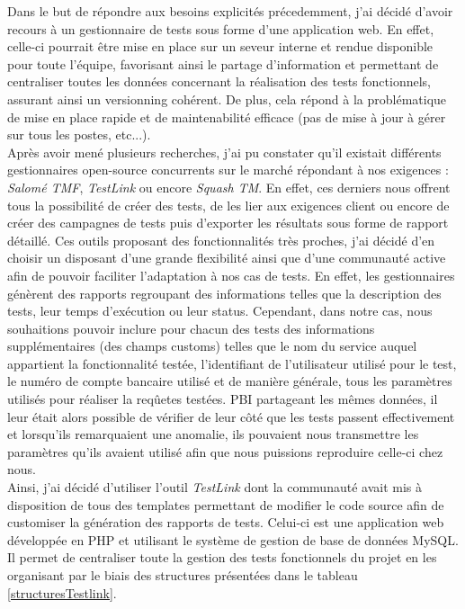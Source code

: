 	Dans le but de répondre aux besoins explicités précedemment, j'ai décidé d'avoir recours à un gestionnaire de tests sous forme d'une application web. En effet, celle-ci pourrait être mise en place sur un seveur interne et rendue disponible pour toute l'équipe, favorisant ainsi le partage d'information et permettant de centraliser toutes les données concernant la réalisation des tests fonctionnels, assurant ainsi un versionning cohérent. De plus, cela répond à la problématique de mise en place rapide et de maintenabilité efficace (pas de mise à jour à gérer sur tous les postes, etc...). \\
	
	Après avoir mené plusieurs recherches, j'ai pu constater qu'il existait différents gestionnaires open-source concurrents sur le marché répondant à nos exigences : \textit{Salomé TMF}, \textit{TestLink} ou encore \textit{Squash TM}. En effet, ces derniers nous offrent tous la possibilité de créer des tests, de les lier aux exigences client ou encore de créer des campagnes de tests puis d'exporter les résultats sous forme de rapport détaillé. Ces outils proposant des fonctionnalités très proches, j'ai décidé d'en choisir un disposant d'une grande flexibilité ainsi que d'une communauté active afin de pouvoir faciliter l'adaptation à nos cas de tests. En effet, les gestionnaires génèrent des rapports regroupant des informations telles que la description des tests, leur temps d'exécution ou leur status. Cependant, dans notre cas, nous souhaitions pouvoir inclure pour chacun des tests des informations supplémentaires (des champs customs) telles que le nom du service auquel appartient la fonctionnalité testée, l'identifiant de l'utilisateur utilisé pour le test, le numéro de compte bancaire utilisé et de manière générale, tous les paramètres utilisés pour réaliser la reqûetes testées. PBI partageant les mêmes données, il leur était alors possible de vérifier de leur côté que les tests passent effectivement et lorsqu'ils remarquaient une anomalie, ils pouvaient nous transmettre les paramètres qu'ils avaient utilisé afin que nous puissions reproduire celle-ci chez nous. \\
	
	Ainsi, j'ai décidé d'utiliser l'outil \textit{TestLink} dont la communauté avait mis à disposition de tous des templates permettant de modifier le code source afin de customiser la génération des rapports de tests. Celui-ci est une application web développée en PHP et utilisant le système de gestion de base de données MySQL. Il permet de centraliser toute la gestion des tests fonctionnels du projet en les organisant par le biais des structures présentées dans le tableau \ref{structuresTestlink}.

